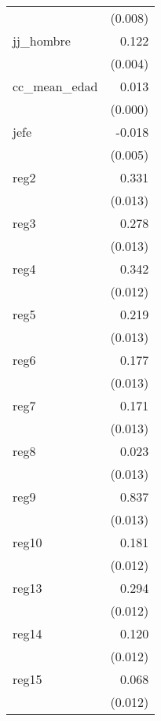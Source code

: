 {\begin{longtable}{l*{1}{D{.}{.}{-1}}}
            &     (0.008)         \\
\addlinespace
jj\_hombre   &       0.122\sym{***}\\
            &     (0.004)         \\
\addlinespace
cc\_mean\_edad&       0.013\sym{***}\\
            &     (0.000)         \\
\addlinespace
jefe        &      -0.018\sym{***}\\
            &     (0.005)         \\
\addlinespace
reg2        &       0.331\sym{***}\\
            &     (0.013)         \\
\addlinespace
reg3        &       0.278\sym{***}\\
            &     (0.013)         \\
\addlinespace
reg4        &       0.342\sym{***}\\
            &     (0.012)         \\
\addlinespace
reg5        &       0.219\sym{***}\\
            &     (0.013)         \\
\addlinespace
reg6        &       0.177\sym{***}\\
            &     (0.013)         \\
\addlinespace
reg7        &       0.171\sym{***}\\
            &     (0.013)         \\
\addlinespace
reg8        &       0.023         \\
            &     (0.013)         \\
\addlinespace
reg9        &       0.837\sym{***}\\
            &     (0.013)         \\
\addlinespace
reg10       &       0.181\sym{***}\\
            &     (0.012)         \\
\addlinespace
reg13       &       0.294\sym{***}\\
            &     (0.012)         \\
\addlinespace
reg14       &       0.120\sym{***}\\
            &     (0.012)         \\
\addlinespace
reg15       &       0.068\sym{***}\\
            &     (0.012)         \\

\end{longtable}}
